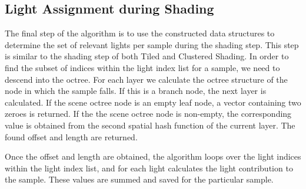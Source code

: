 \subsection{Light Assignment during Shading}

The final step of the algorithm is to use the constructed data structures to determine the set
of relevant lights per sample during the shading step. This step is similar to the shading
step of both Tiled and Clustered Shading. In order to find the subset of indices within the
light index list for a sample, we need to descend into the octree. For each layer we
calculate the octree structure of the node in which the sample falls. If this is a branch node,
the next layer is calculated. If the scene octree node is an empty leaf node, a vector containing
two zeroes is returned. If the the scene octree node is non-empty, the corresponding value is
obtained from the second spatial hash function of the current layer. The found offset and length
are returned.

Once the offset and length are obtained, the algorithm loops over the light indices within
the light index list, and for each light calculates the light contribution to the sample.
These values are summed and saved for the particular sample.

